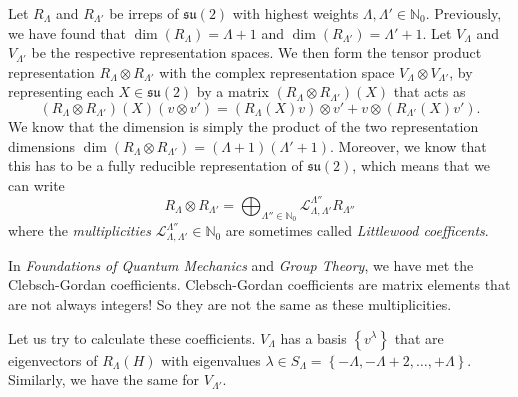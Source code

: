 Let $R_\Lambda$ and $R_{\Lambda'}$ be irreps of $\mathfrak{su}(2)$ with highest weights $\Lambda, \Lambda' \in \mathbb{N}_0$. Previously, we have found that $\dim(R_\Lambda) = \Lambda + 1$ and $\dim (R_{\Lambda'}) = \Lambda' + 1$.
Let $V_{\Lambda}$ and $V_{\Lambda'}$ be the respective representation spaces.
We then form the tensor product representation $R_{\Lambda} \otimes R_{\Lambda'}$ with the complex representation space $V_{\Lambda} \otimes V_{\Lambda'}$, by representing each $X \in \mathfrak{su}(2)$ by a matrix $(R_{\Lambda} \otimes R_{\Lambda'})(X)$ that acts as
\begin{equation}
  (R_{\Lambda} \otimes R_{\Lambda'})(X)(v \otimes v') = (R_{\Lambda}(X)v) \otimes v' + v \otimes (R_{\Lambda'}(X)v').
\end{equation}
We know that the dimension is simply the product of the two representation dimensions $\dim(R_{\Lambda} \otimes R_{\Lambda'}) = (\Lambda + 1)(\Lambda' + 1)$.
Moreover, we know that this has to be a fully reducible representation of $\mathfrak{su}(2)$, which means that we can write
\begin{equation}
  R_{\Lambda} \otimes R_{\Lambda'} = \bigoplus_{\Lambda'' \in \mathbb{N}_0} \mathcal{L}^{\Lambda''}_{\Lambda, \Lambda'} R_{\Lambda''}
\end{equation}
where the \emph{multiplicities} $\mathcal{L}^{\Lambda''}_{\Lambda, \Lambda'} \in \mathbb{N}_0$ are sometimes called \emph{Littlewood coefficents}.
\begin{leftbar}
  \begin{remark}
    In \emph{Foundations of Quantum Mechanics} and \emph{Group Theory}, we have met the Clebsch-Gordan coefficients.
    Clebsch-Gordan coefficients are matrix elements that are not always integers! So they are not the same as these multiplicities.
  \end{remark}
\end{leftbar}

Let us try to calculate these coefficients.
$V_\Lambda$ has a basis $\left\{ v^{\lambda} \right\}$ that are eigenvectors of $R_\Lambda(H)$ with eigenvalues $\lambda \in S_{\Lambda} = \left\{ -\Lambda, -\Lambda + 2, \dots, +\Lambda \right\}$. Similarly, we have the same for $V_{\Lambda'}$.
